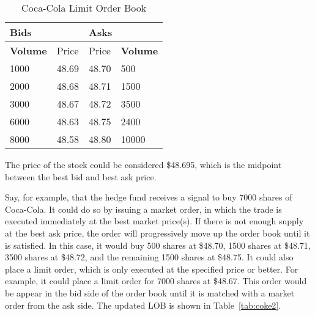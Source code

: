 \begin{table}[htbp]
\caption{Coca-Cola Limit Order Book} \label{tab:coke1}
\begin{center}
\begin{tabular}{ll|ll}
\hline \hline
\multicolumn{2}{l|}{\textbf{Bids}} & \multicolumn{2}{l}{\textbf{Asks}} \\
\hline
\textbf{Volume}           & Price          & Price           & \textbf{Volume}          \\
\hline
1000             & 48.69          & 48.70           & 500             \\
2000             & 48.68          & 48.71           & 1500            \\
3000             & 48.67          & 48.72           & 3500            \\
6000             & 48.63          & 48.75           & 2400            \\
8000             & 48.58          & 48.80           & 10000          
\end{tabular}
\end{center}
\end{table}

The price of the stock could be considered \$48.695, which is the midpoint between the best bid and best ask price. 

Say, for example, that the hedge fund receives a signal to buy 7000 shares of Coca-Cola. It could do so by issuing a market order, in which the trade is executed immediately at the best market price(s). If there is not enough supply at the best ask price, the order will progressively move up the order book until it is satisfied. In this case, it would buy 500 shares at \$48.70, 1500 shares at \$48.71, 3500 shares at \$48.72, and the remaining 1500 shares at \$48.75. It could also place a limit order, which is only executed at the specified price or better. For example, it could place a limit order for 7000 shares at \$48.67. This order would be appear in the bid side of the order book until it is matched with a market order from the ask side. The updated LOB is shown in Table~\ref{tab:coke2}.

